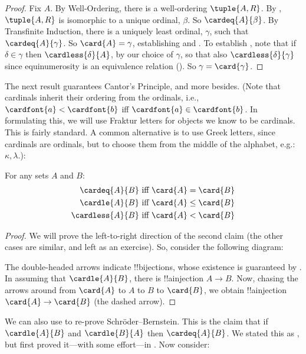 \documentclass[../../../include/open-logic-section]{subfiles}
\begin{document}
\begin{proof}
Fix $A$. By Well-Ordering, there is a well-ordering $\tuple{A, R}$. By
, $\tuple{A,
R}$ is isomorphic to a unique ordinal, $\beta$. So
$\cardeq{A}{\beta}$. By Transfinite Induction, there is a uniquely
least ordinal, $\gamma$, such that $\cardeq{A}{\gamma}$. So $\card{A}
= \gamma$, establishing  and .
To establish , note that if $\delta \in \gamma$ then
$\cardless{\delta}{A}$, by our choice of $\gamma$, so that also
$\cardless{\delta}{\gamma}$ since equinumerosity is an equivalence
relation (). So $\gamma =
\card{\gamma}$. 
\end{proof}

The next result guarantees Cantor's Principle, and more besides.
(Note that cardinals inherit their ordering from the ordinals, i.e.,
$\cardfont{a} < \cardfont{b}$ iff $\cardfont{a} \in \cardfont{b}$. In
formulating this, we will use Fraktur letters for objects we know to be
cardinals. This is fairly standard. A common alternative is to use
Greek letters, since cardinals are ordinals, but to choose them from
the middle of the alphabet, e.g.: $\kappa, \lambda$.):
\begin{lem}
For any sets $A$ and $B$:
\begin{align*}
	\cardeq{A}{B} &\text{ iff } \card{A} = \card{B}\\
	\cardle{A}{B} &\text{ iff } \card{A} \leq \card{B}\\
	\cardless{A}{B}&\text{ iff } \card{A} < \card{B}
\end{align*}
\end{lem}

\begin{proof}
We will prove the left-to-right direction of the second claim (the
other cases are similar, and left as an exercise). So, consider the
following diagram:
\begin{center}
\end{center}
The double-headed arrows indicate !!{bijection}s, whose existence is
guaranteed by . In assuming that
$\cardle{A}{B}$, there is !!a{injection}  $A\to B$. Now,
chasing the arrows around from $\card{A}$ to $A$ to $B$ to $\card{B}$,
we obtain !!a{injection} $\card{A} \to \card{B}$ (the dashed arrow).
\end{proof}\noindent We can also use 
to re-prove Schr\"{o}der--Bernstein. This is the claim that if
$\cardle{A}{B}$ and $\cardle{B}{A}$ then $\cardeq{A}{B}$. We stated
this as , but first proved
it---with some effort---in .
Now consider:
\end{document}
